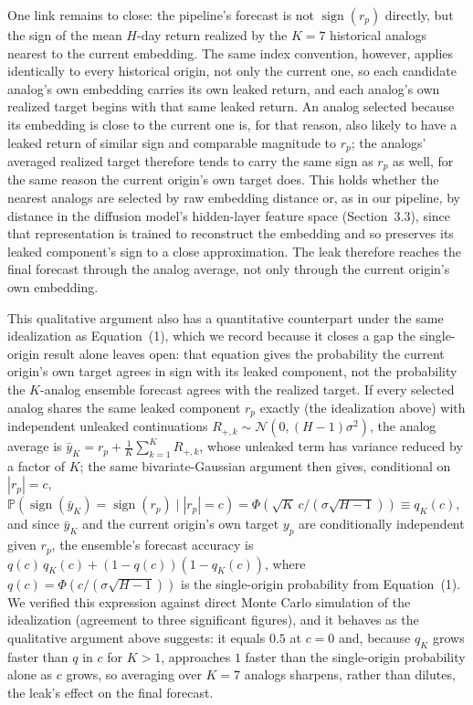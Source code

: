 \documentclass[preprint,12pt]{elsarticle}
\begin{document}
One link remains to close: the pipeline's forecast is not $\operatorname{sign}(r_p)$ directly,
but the sign of the mean $H$-day return realized by the $K=7$ historical analogs nearest to the
current embedding. The same index convention, however, applies identically to every historical
origin, not only the current one, so each candidate analog's own embedding carries its own
leaked return, and each analog's own realized target begins with that same leaked return. An
analog selected because its embedding is close to the current one is, for that reason, also
likely to have a leaked return of similar sign and comparable magnitude to $r_p$; the analogs'
averaged realized target therefore tends to carry the same sign as $r_p$ as well, for the same
reason the current origin's own target does. This holds whether the nearest analogs are
selected by raw embedding distance or, as in our pipeline, by distance in the diffusion model's
hidden-layer feature space (Section~3.3), since that representation is trained to reconstruct
the embedding and so preserves its leaked component's sign to a close approximation. The leak
therefore reaches the final forecast through the analog average, not only through the current
origin's own embedding.

This qualitative argument also has a quantitative counterpart under the same idealization as
Equation~(1), which we record because it closes a gap the single-origin result alone leaves
open: that equation gives the probability the current origin's own target agrees in sign with
its leaked component, not the probability the $K$-analog ensemble forecast agrees with the
realized target. If every selected analog shares the same leaked component $r_p$ exactly (the
idealization above) with independent unleaked continuations $R_{+,k} \sim
\mathcal{N}(0,(H-1)\sigma^2)$, the analog average is $\bar{y}_K = r_p + \frac{1}{K}\sum_{k=1}^K
R_{+,k}$, whose unleaked term has variance reduced by a factor of $K$; the same bivariate-Gaussian
argument then gives, conditional on $|r_p|=c$, $\mathbb{P}(\operatorname{sign}(\bar{y}_K) =
\operatorname{sign}(r_p) \mid |r_p|=c) = \Phi(\sqrt{K}\,c/(\sigma\sqrt{H-1})) \equiv q_K(c)$, and
since $\bar y_K$ and the current origin's own target $y_p$ are conditionally independent given
$r_p$, the ensemble's forecast accuracy is $q(c)\,q_K(c) + (1-q(c))(1-q_K(c))$, where
$q(c)=\Phi(c/(\sigma\sqrt{H-1}))$ is the single-origin probability from Equation~(1). We verified
this expression against direct Monte Carlo simulation of the idealization (agreement to three
significant figures), and it behaves as the qualitative argument above suggests: it equals $0.5$
at $c=0$ and, because $q_K$ grows faster than $q$ in $c$ for $K>1$, approaches $1$ faster than
the single-origin probability alone as $c$ grows, so averaging over $K=7$ analogs sharpens,
rather than dilutes, the leak's effect on the final forecast.
\end{document}
